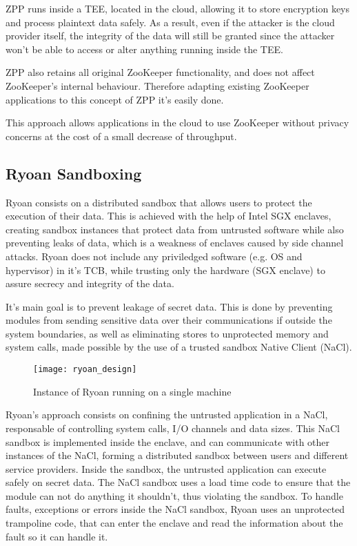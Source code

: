 ZPP runs inside a TEE, located in the cloud, allowing it to store encryption keys and process plaintext data safely. As a result, even if the attacker is the cloud provider itself, the integrity of the data will still be granted since the attacker won't be able to access or alter anything running inside the TEE.

ZPP also retains all original ZooKeeper functionality, and does not affect ZooKeeper's internal behaviour. Therefore adapting existing ZooKeeper applications to this concept of ZPP it's easily done.

This approach allows applications in the cloud to use ZooKeeper without privacy concerns at the cost of a small decrease of throughput.

\subsection{Ryoan Sandboxing}
\label{ssec:ryoan_sandboxing}

Ryoan \cite{ryoanPaper} consists on a distributed sandbox that allows users to protect the execution of their data. This is achieved with the help of Intel SGX \cite{intelSGX} \cite{sgxPaper} enclaves, creating sandbox instances that protect data from untrusted software while also preventing leaks of data, which is a weakness of enclaves caused by side channel attacks.
Ryoan does not include any priviledged software (e.g. OS and hypervisor) in it's TCB, while trusting only the hardware (SGX enclave) to assure secrecy and integrity of the data.

It's main goal is to prevent leakage of secret data. This is done by preventing modules from sending sensitive data over their communications if outside the system boundaries, as well as eliminating stores to unprotected memory and system calls, made possible by the use of a trusted sandbox Native Client (NaCl). 

\begin{figure}[htbp]
	\centering
	{\texttt{[image: ryoan\_design]}}%
	\caption{Instance of Ryoan running on a single machine}
\end{figure}

Ryoan's approach consists on confining the untrusted application in a NaCl, responsable of controlling system calls, I/O channels and data sizes. This NaCl sandbox is implemented inside the enclave, and can communicate with other instances of the NaCl, forming a distributed sandbox between users and different service providers. Inside the sandbox, the untrusted application can execute safely on secret data. The NaCl sandbox uses a load time code to ensure that the module can not do anything it shouldn't, thus violating the sandbox. To handle faults, exceptions or errors inside the NaCl sandbox, Ryoan uses an unprotected trampoline code, that can enter the enclave and read the information about the fault so it can handle it.



